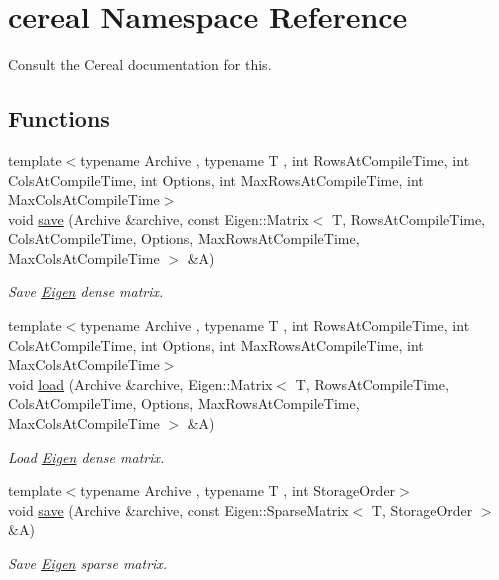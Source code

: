 \hypertarget{namespacecereal}{}\section{cereal Namespace Reference}
\label{namespacecereal}


Consult the Cereal documentation for this.  


\subsection*{Functions}
\begin{DoxyCompactItemize}
\item 
{\footnotesize template$<$typename Archive , typename T , int Rows\+At\+Compile\+Time, int Cols\+At\+Compile\+Time, int Options, int Max\+Rows\+At\+Compile\+Time, int Max\+Cols\+At\+Compile\+Time$>$ }\\void \hyperlink{namespacecereal_afd0f4831f36c8d183e4ff80c96b6b9ed}{save} (Archive \&archive, const Eigen\+::\+Matrix$<$ T, Rows\+At\+Compile\+Time, Cols\+At\+Compile\+Time, Options, Max\+Rows\+At\+Compile\+Time, Max\+Cols\+At\+Compile\+Time $>$ \&A)
\begin{DoxyCompactList}\small\item\em Save \hyperlink{namespaceEigen}{Eigen} dense matrix. \end{DoxyCompactList}\item 
{\footnotesize template$<$typename Archive , typename T , int Rows\+At\+Compile\+Time, int Cols\+At\+Compile\+Time, int Options, int Max\+Rows\+At\+Compile\+Time, int Max\+Cols\+At\+Compile\+Time$>$ }\\void \hyperlink{namespacecereal_a62dfe53ce43ad27c02ca954e9da31dc5}{load} (Archive \&archive, Eigen\+::\+Matrix$<$ T, Rows\+At\+Compile\+Time, Cols\+At\+Compile\+Time, Options, Max\+Rows\+At\+Compile\+Time, Max\+Cols\+At\+Compile\+Time $>$ \&A)
\begin{DoxyCompactList}\small\item\em Load \hyperlink{namespaceEigen}{Eigen} dense matrix. \end{DoxyCompactList}\item 
{\footnotesize template$<$typename Archive , typename T , int Storage\+Order$>$ }\\void \hyperlink{namespacecereal_ad34bb4c1089438eff2040f675acc4855}{save} (Archive \&archive, const Eigen\+::\+Sparse\+Matrix$<$ T, Storage\+Order $>$ \&A)
\begin{DoxyCompactList}\small\item\em Save \hyperlink{namespaceEigen}{Eigen} sparse matrix. \end{DoxyCompactList}\item 

\end{DoxyCompactItemize}
